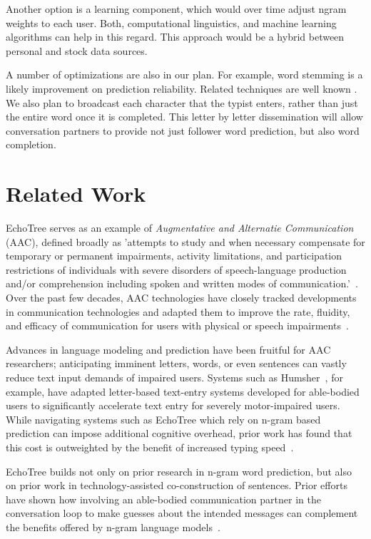 \documentclass{sigchi}
\begin{document}
Another option is a learning component, which would over time adjust
ngram weights to each user. Both, computational linguistics, and
machine learning algorithms can help in this regard. This approach
would be a hybrid between personal and stock data sources.

A number of optimizations are also in our plan. For example, word
stemming is a likely improvement on prediction reliability. Related
techniques are well known \cite{PorterStemmerAlgorithm}. We also plan
to broadcast each character that the typist enters, rather than just
the entire word once it is completed. This letter by letter
dissemination will allow conversation partners to provide not just
follower word prediction, but also word completion.

\section{Related Work}

EchoTree serves as an example of {\em Augmentative and Alternatie
  Communication} (AAC), defined broadly as 'attempts to study and when
necessary compensate for temporary or permanent impairments, activity
limitations, and participation restrictions of individuals with severe
disorders of speech-language production and/or comprehension including
spoken and written modes of communication.'~\cite{asha2005}. Over the
past few decades, AAC technologies have closely tracked developments
in communication technologies and adapted them to improve the rate,
fluidity, and efficacy of communication for users with physical or
speech impairments~\cite{vanderheiden2002}. 


Advances in language modeling and prediction have been fruitful for
AAC researchers; anticipating imminent letters, words, or even
sentences can vastly reduce text input demands of impaired
users. Systems such as Humsher~\cite{Polacek2011}, for example, have
adapted letter-based text-entry systems developed for able-bodied
users to significantly accelerate text entry for severely
motor-impaired users. While navigating systems such as EchoTree which
rely on n-gram based prediction can impose additional cognitive
overhead, prior work has found that this cost is outweighted by the
benefit of increased typing speed~\cite{Trnka2009}. 


EchoTree builds not only on prior research in n-gram word prediction,
but also on prior work in technology-assisted co-construction of
sentences. Prior efforts have shown how involving an able-bodied
communication partner in the conversation loop to make guesses about
the intended messages can complement the benefits offered by n-gram
language models~\cite{Roark2011}. 
\end{document}
